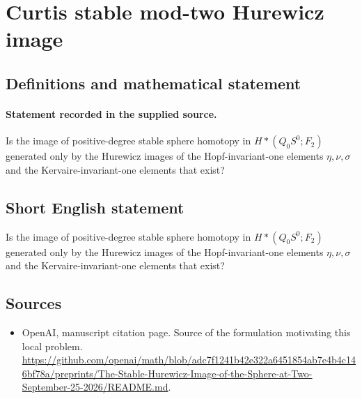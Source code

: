 \documentclass[11pt]{article}
\begin{document}
\section*{Curtis stable mod-two Hurewicz image}\label{statement}
\subsection{Definitions and mathematical statement}
\paragraph{Statement recorded in the supplied source.}
Is the image of positive-degree stable sphere homotopy in $H*(Q_{0}S^{0};F_{2})$ generated only by the Hurewicz images of the Hopf-invariant-one elements $\eta ,\nu ,\sigma $ and the Kervaire-invariant-one elements that exist?
\subsection{Short English statement}
Is the image of positive-degree stable sphere homotopy in $H*(Q_{0}S^{0};F_{2})$ generated only by the Hurewicz images of the Hopf-invariant-one elements $\eta ,\nu ,\sigma $ and the Kervaire-invariant-one elements that exist?
\subsection{Sources}
\begin{itemize}
\item[S1] OpenAI, manuscript citation page. Source of the formulation motivating this local problem.
\url{https://github.com/openai/math/blob/adc7f1241b42e322a6451854ab7e4b4c146bf78a/preprints/The-Stable-Hurewicz-Image-of-the-Sphere-at-Two-September-25-2026/README.md}.
\end{itemize}
\end{document}
